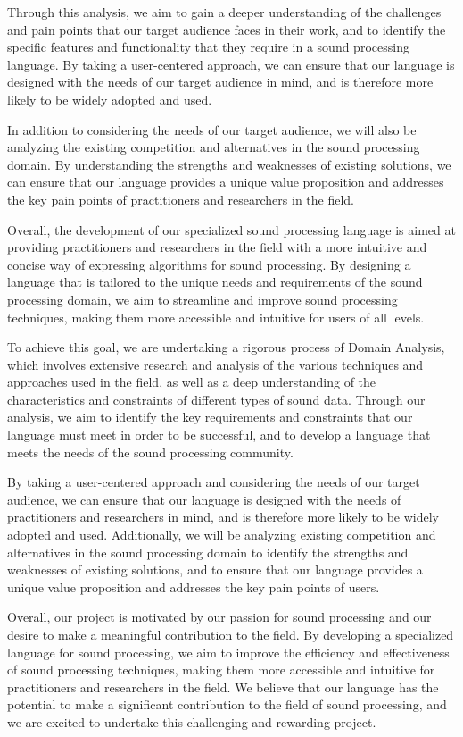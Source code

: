 Through this analysis, we aim to gain a deeper understanding of the challenges and pain points that our target audience faces in their work, and to identify the specific features and functionality that they require in a sound processing language. By taking a user-centered approach, we can ensure that our language is designed with the needs of our target audience in mind, and is therefore more likely to be widely adopted and used.

In addition to considering the needs of our target audience, we will also be analyzing the existing competition and alternatives in the sound processing domain. By understanding the strengths and weaknesses of existing solutions, we can ensure that our language provides a unique value proposition and addresses the key pain points of practitioners and researchers in the field.

Overall, the development of our specialized sound processing language is aimed at providing practitioners and researchers in the field with a more intuitive and concise way of expressing algorithms for sound processing. By designing a language that is tailored to the unique needs and requirements of the sound processing domain, we aim to streamline and improve sound processing techniques, making them more accessible and intuitive for users of all levels.

To achieve this goal, we are undertaking a rigorous process of Domain Analysis, which involves extensive research and analysis of the various techniques and approaches used in the field, as well as a deep understanding of the characteristics and constraints of different types of sound data. Through our analysis, we aim to identify the key requirements and constraints that our language must meet in order to be successful, and to develop a language that meets the needs of the sound processing community.

By taking a user-centered approach and considering the needs of our target audience, we can ensure that our language is designed with the needs of practitioners and researchers in mind, and is therefore more likely to be widely adopted and used. Additionally, we will be analyzing existing competition and alternatives in the sound processing domain to identify the strengths and weaknesses of existing solutions, and to ensure that our language provides a unique value proposition and addresses the key pain points of users.

Overall, our project is motivated by our passion for sound processing and our desire to make a meaningful contribution to the field. By developing a specialized language for sound processing, we aim to improve the efficiency and effectiveness of sound processing techniques, making them more accessible and intuitive for practitioners and researchers in the field. We believe that our language has the potential to make a significant contribution to the field of sound processing, and we are excited to undertake this challenging and rewarding project.